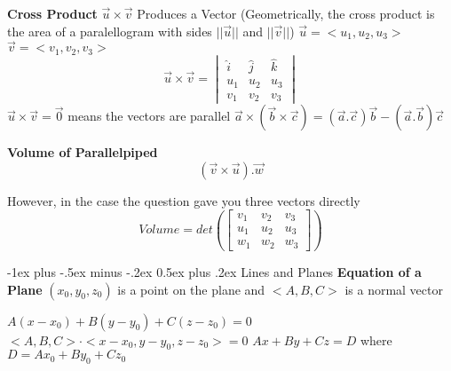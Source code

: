 \documentclass[10pt,a4paper,landscape]{article}
\makeatletter
\renewcommand{\subsection}{\@startsection{subsection}{2}{0mm}%
{-1ex plus -.5ex minus -.2ex}%
{0.5ex plus .2ex}%
{\normalfont\normalsize\bfseries}}
\makeatother
\begin{document}
\begin{multicols*}{5}
	\textbf{Cross Product}\newline
	$\vec{u} \times \vec{v}$\newline
	Produces a Vector\newline
	(Geometrically, the cross product is the area of a paralellogram with sides $ ||\vec{u}|| $ and $ ||\vec{v}|| $)\newline
	$\vec{u} = < u_1, u_2, u_3 >$\newline
	$\vec{v} = < v_1, v_2, v_3 >$\newline
	\[
		\vec{u} \times \vec{v} = 
		\begin{vmatrix}
			\hat{i} & \hat{j} & \hat{k} \\
			u_1 & u_2 & u_3 \\
			v_1 & v_2 & v_3
		\end{vmatrix}
	\]\newline 
	$ \vec{u} \times \vec{v} = \vec{0} $ means the vectors are parallel \newline
	$ \vec{ a } \times ( \vec{ b } \times \vec{ c } )= ( \vec{ a } . \vec{ c } ) \vec{ b } - ( \vec{ a } . \vec{ b } ) \vec{ c }$ \newline

	\textbf{Volume of Parallelpiped} \newline 
	\begin{equation*}
		( \vec{ v } \times \vec{ u } ) . \vec{ w }
	\end{equation*}

	However, in the case the question gave you three vectors directly
	\begin{equation*}
		Volume = det \left( \left [
			\begin{matrix}
				v_1&v_2&v_3\\u_1&u_2&u_3\\w_1&w_2&w_3
			\end{matrix}
			\right]
		\right)
	\end{equation*}


	\subsection {Lines and Planes}
	\textbf{Equation of a Plane}\newline
	$ (x_0, y_0, z_0) $ is a point on the plane and $ <A,B,C> $ is a normal vector

	$A(x-x_0)+B(y-y_0)+C(z-z_0) = 0$\newline
	$ <A,B,C> \cdot <x-x_0, y-y_0, z-z_0> = 0 $\newline
	$ Ax+By+Cz = D $ where $ D=Ax_0+By_0+Cz_0 $\newline


\end{multicols*}
\end{document}

